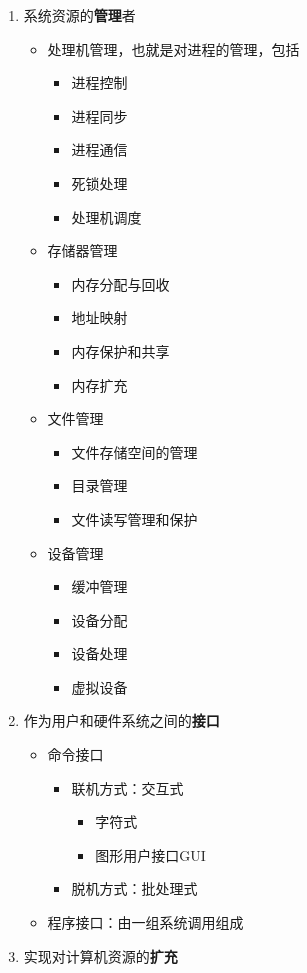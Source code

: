 \documentclass[12pt, a4paper, oneside]{ctexart}
\begin{document}
\begin{enumerate}
  \item 系统资源的\textbf{管理}者
  \begin{itemize}
    \item 处理机管理，也就是对进程的管理，包括
    \begin{itemize}
      \item 进程控制
      \item 进程同步
      \item 进程通信
      \item 死锁处理
      \item 处理机调度
    \end{itemize}
    \item 存储器管理
    \begin{itemize}
      \item 内存分配与回收
      \item 地址映射
      \item 内存保护和共享
      \item 内存扩充
    \end{itemize}
    \item 文件管理
    \begin{itemize}
      \item 文件存储空间的管理
      \item 目录管理
      \item 文件读写管理和保护
    \end{itemize}
    \item 设备管理
    \begin{itemize}
      \item 缓冲管理
      \item 设备分配
      \item 设备处理
      \item 虚拟设备
    \end{itemize}
  \end{itemize}
  \item 作为用户和硬件系统之间的\textbf{接口}
  \begin{itemize}
    \item 命令接口
    \begin{itemize}
      \item 联机方式：交互式
      \begin{itemize}
        \item 字符式
        \item 图形用户接口GUI
      \end{itemize}
      \item 脱机方式：批处理式
    \end{itemize}
    \item 程序接口：由一组系统调用组成
  \end{itemize}
  \item 实现对计算机资源的\textbf{扩充}
\end{enumerate}
\end{document}
